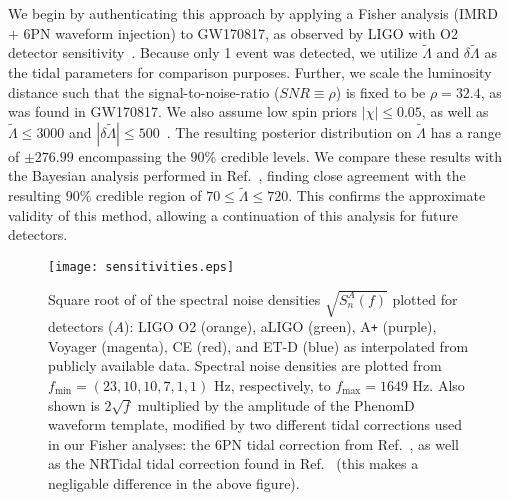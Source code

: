 \documentclass[prd,twocolumn,nofootinbib,superscriptaddress,amsmath,amssymb]{revtex4-1}
\begin{document}
We begin by authenticating this approach by applying a Fisher analysis (IMRD + 6PN waveform injection) to GW170817, as observed by LIGO with O2 detector sensitivity~\cite{aLIGO}.
Because only 1 event was detected, we utilize $\tilde\Lambda$ and $\delta\tilde\Lambda$ as the tidal parameters for comparison purposes.
Further, we scale the luminosity distance such that the signal-to-noise-ratio ($SNR \equiv \rho$) is fixed to be $\rho=32.4$, as was found in GW170817.
We also assume low spin priors $|\chi| \leq 0.05$, as well as $\tilde{\Lambda} \leq 3000$ and $|\delta \tilde{\Lambda}| \leq 500$~\cite{Wade:LambdaPriors}.
The resulting posterior distribution on $\tilde{\Lambda}$ has a range of $\pm 276.99$ encompassing the $90\%$ credible levels.
We compare these results with the Bayesian analysis performed in Ref.~\cite{TheLIGOScientific:2017qsa,Abbott2018}, finding close agreement with the resulting $90\%$ credible region of $70 \leq \tilde{\Lambda} \leq 720$.
This confirms the approximate validity of this method, allowing a continuation of this analysis for future detectors.
\begin{figure}
\begin{center} 
\texttt{[image: sensitivities.eps]}
\end{center}
\caption{
Square root of of the spectral noise densities $\sqrt{S_n^A(f)}$ plotted for detectors ($A$): LIGO O2 (orange), aLIGO (green), A\texttt{+} (purple), Voyager (magenta), CE (red), and ET-D (blue) as interpolated from publicly available data.
Spectral noise densities are plotted from $f_{\text{min}}=(23,10,10,7,1,1) \text{ Hz}$, respectively, to $f_{\text{max}}=1649 \text{ Hz}$.
Also shown is $2 \sqrt{f}$ multiplied by the amplitude of the PhenomD~\cite{PhenomDI,PhenomDII} waveform template, modified by two different tidal corrections used in our Fisher analyses: the 6PN tidal correction from Ref.~\cite{Wade:tidalCorrections}, as well as the NRTidal tidal correction found in Ref.~\cite{Samajdar:NRTidal} (this makes a negligable difference in the above figure).
}
\label{fig:sensitivities}
\end{figure}
\end{document}
